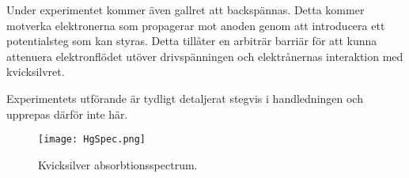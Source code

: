 Under experimentet kommer även gallret att backspännas. Detta kommer motverka elektronerna som propagerar mot anoden genom att introducera ett potentialsteg som kan styras. Detta tillåter en arbiträr barriär för att kunna attenuera elektronflödet utöver drivspänningen och elektrånernas interaktion med kvicksilvret. 

Experimentets utförande är tydligt detaljerat stegvis i handledningen\cite{handledning} och upprepas därför inte här. 
\begin{figure}[hb]
	\centering
	\texttt{[image: HgSpec.png]}
	\caption{Kvicksilver absorbtionsspectrum.\cite{astronoo}}
	\label{fig:hgspec}
\end{figure}

